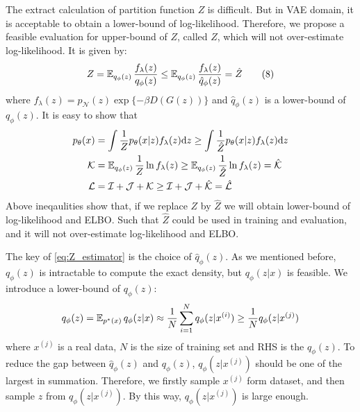 The extract calculation of partition function $Z$ is difficult. But in VAE domain, it is acceptable to obtain a lower-bound of log-likelihood. Therefore, we propose a feasible evaluation for upper-bound of $Z$, called $\hat{Z}$, which will not over-estimate log-likelihood. 
It is given by:
\begin{align*}\label{eq:Z_estimator}
	Z = \operatorname{\mathbb{E}}_{q_\phi(z)}\frac{f_\lambda(z)}{q_\phi(z)} \leq \operatorname{\mathbb{E}}_{q_\phi(z)} \frac{f_\lambda(z)}{\hat{q}_\phi(z)} = \hat{Z} \tag{8}
\end{align*}
where $f_\lambda(z) = p_\mathcal{N}(z) \exp\{- \beta D(G(z))\}$ and $\hat{q}_\phi(z)$ is a lower-bound of $q_\phi(z)$. It is easy to show that
\begin{align*}
	p_\theta(x) &= \int \frac{1}{Z} p_\theta(x|z) f_\lambda(z) \mathrm{d} z \geq \int \frac{1}{\hat{Z}} p_\theta(x|z) f_\lambda(z) \mathrm{d} z \\
\mathcal{K} &= \operatorname{\mathbb{E}}_{q_\phi(z)} \frac{1}{Z} \ln f_\lambda(z) \geq \operatorname{\mathbb{E}}_{q_\phi(z)} \frac{1}{\hat{Z}}\ln f_\lambda(z) = \mathcal{\hat{K}} \\
\mathcal{L} &= \mathcal{I} + \mathcal{J} + \mathcal{K} \geq \mathcal{I} + \mathcal{J} + \mathcal{\hat{K}} = \mathcal{\hat{L}}
\end{align*}
Above ineqaulities show that, if we replace $Z$ by $\hat{Z}$ we will obtain lower-bound of log-likelihood and ELBO. Such that $\hat{Z}$ could be used in training and evaluation, and it will not over-estimate log-likelihood and ELBO. 

The key of \cref{eq:Z_estimator} is the choice of $\hat{q}_\phi(z)$. As we mentioned before, $q_\phi(z)$ is intractable to compute the exact density, but $q_\phi(z|x)$ is feasible. We introduce a lower-bound of  $q_\phi(z)$:
\begin{equation*}
	q_\phi(z) = \operatorname{\mathbb{E}}_{p^*(x)} q_\phi(z|x) \approx \frac{1}{N}\sum_{i=1}^N q_\phi(z|x^{(i)}) \geq \frac{1}{N} q_\phi(z|x^{(j)})
\end{equation*}
where $x^{(j)}$ is a real data, $N$ is the size of training set and RHS is the $\hat{q}_\phi(z)$. To reduce the gap between $\hat{q}_\phi(z)$ and $q_\phi(z)$, $q_\phi(z|x^{(j)})$ should be one of the largest in summation. Therefore, we firstly sample $x^{(j)}$ form dataset, and then sample $z$ from $q_\phi(z|x^{(j)})$. By this way, $q_\phi(z|x^{(j)})$ is  large enough. 

